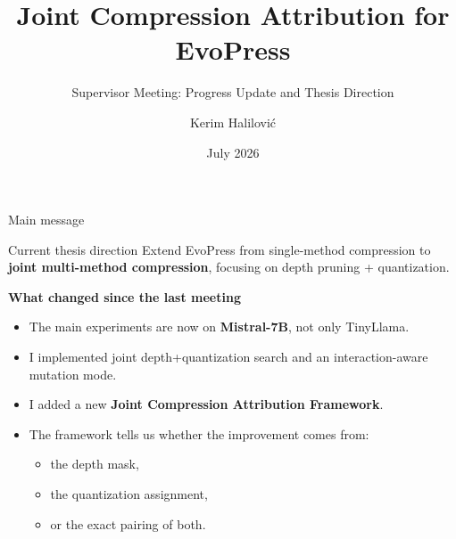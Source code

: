 \documentclass[aspectratio=169]{beamer}
\title[EvoPress Attribution]{Joint Compression Attribution for EvoPress}
\subtitle{Supervisor Meeting: Progress Update and Thesis Direction}
\author[Kerim Halilovi\'c]{Kerim Halilovi\'c}
\institute[TU Wien]{TU Wien, Vienna, Austria}
\date{July 2026}
\begin{document}
\begin{frame}
  \titlepage
\end{frame}


\begin{frame}{Main message}
\begin{block}{Current thesis direction}
Extend EvoPress from single-method compression to \textbf{joint multi-method compression}, focusing on depth pruning + quantization.
\end{block}

\vspace{0.25cm}
\textbf{What changed since the last meeting}
\begin{itemize}
    \item The main experiments are now on \textbf{Mistral-7B}, not only TinyLlama.
    \item I implemented joint depth+quantization search and an interaction-aware mutation mode.
    \item I added a new \textbf{Joint Compression Attribution Framework}.
    \item The framework tells us whether the improvement comes from:
    \begin{itemize}
        \item the depth mask,
        \item the quantization assignment,
        \item or the exact pairing of both.
    \end{itemize}
\end{itemize}
\end{frame}

\end{document}
